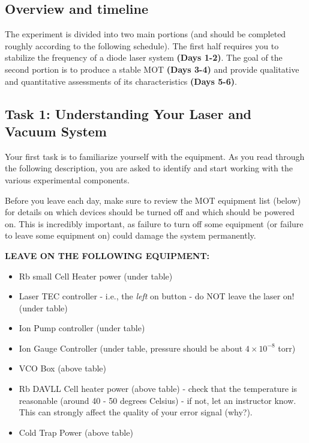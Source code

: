 \documentclass{../lab}
\begin{document}
\subsection{Overview and timeline}

The experiment is divided into two main portions (and should be completed roughly according to the following schedule). The first half requires you to stabilize the frequency of a diode laser system \textbf{(Days 1-2)}. The goal of the second portion is to produce a stable MOT \textbf{(Days 3-4)} and provide qualitative and quantitative assessments of its characteristics \textbf{(Days 5-6)}.

\subsection{Task 1: Understanding Your Laser and Vacuum System}

Your first task is to familiarize yourself with the equipment. As you read through the following description, you are asked to identify and start working with the various experimental components.

Before you leave each day, make sure to review the MOT equipment list (below) for details on which devices should be turned off and which should be powered on. This is incredibly important, as failure to turn off some equipment (or failure to leave some equipment on) could damage the system permanently.

\textbf{LEAVE ON THE FOLLOWING EQUIPMENT:}

\begin{itemize}
    \item Rb small Cell Heater power (under table)

    \item Laser TEC controller - i.e., the \textit{left} on button - do NOT leave the laser on! (under table)

    \item Ion Pump controller (under table)

    \item Ion Gauge Controller (under table, pressure should be about $4 \times 10^{-8}$ torr)

    \item VCO Box (above table)

    \item Rb DAVLL Cell heater power (above table) - check that the temperature is reasonable (around 40 - 50 degrees Celsius) - if not, let an instructor know. This can strongly affect the quality of your error signal (why?).

    \item Cold Trap Power (above table)
\end{itemize}
\end{document}

